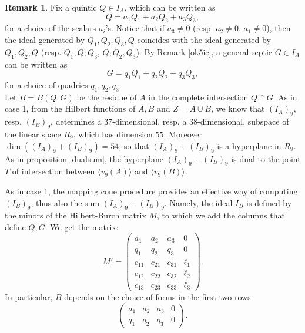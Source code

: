 \documentclass{amsart}
\theoremstyle{definition}
\newtheorem{rem0}[thm0]{Remark}
\begin{document}
\begin{rem0}\label{descr17} Fix a quintic $Q\in I_A$, which can be written as 
$$Q=a_1Q_1+a_2Q_2+a_3Q_3,$$
 for a choice of the scalars $a_i$'s. Notice that
if $a_3\neq 0$ (resp. $a_2\neq 0$. $a_1\neq 0$), then the ideal generated by $Q_1,Q_2,Q_3,Q$ coincides with the ideal generated by $Q_1,Q_2,Q$
(resp. $Q_1,Q,Q_3$, $Q,Q_2,Q_3$). By Remark \ref{ok5ic}, a general septic $G\in I_A$ can be written as 
$$G=q_1Q_1+q_2Q_2+q_3Q_3,$$
for a choice of quadrics $q_1,q_2,q_3$. \\
Let $B=B(Q,G)$ be the residue of $A$ in the complete intersection $Q\cap G$. As in case 1, from the Hilbert functions of $A,B$ and $ Z=A\cup B$, we know that
$(I_A)_9$, resp. $(I_B)_9$, determines a $37$-dimensional, resp. a $38$-dimensional, subspace of the linear space
$R_9$, which has dimension $55$. Moreover $\dim( (I_A)_9+ (I_B)_9 ) = 54$, so that
$ (I_A)_9+ (I_B)_9$ is a hyperplane in $R_9$.\\
As in proposition \ref{dualsum}, the hyperplane $ (I_A)_9+ (I_B)_9$ is dual to the point $T$ of intersection between $\langle v_9(A) \rangle$
and $\langle v_9(B) \rangle$.
\end{rem0}

As in case 1, the mapping cone procedure provides an effective way of computing $(I_B)_9$, thus also the sum $ (I_A)_9+ (I_B)_9$.
Namely, the ideal $I_B$ is defined by the minors of the Hilbert-Burch matrix $M$, to which we add the columns that define $Q,G$. We get the matrix:
\begin{equation}\label{M'}
M' = \begin{pmatrix} a_{1} & a_{2} & a_{3} & 0 \\ q_{1} & q_{2} & q_{3} & 0 \\ c_{11} & c_{21} & c_{31} & \ell_{1} \\ c_{12} & c_{22} & c_{32} & \ell_{2} \\ c_{13} & c_{23} & c_{33} & \ell_{3} 
\end{pmatrix}.
\end{equation}
  In particular, $B$ depends on the choice of forms in the first two rows
 $$ \begin{pmatrix}   a_{1} & a_{2} & a_{3} & 0 \\ q_{1} & q_{2} & q_{3} & 0 \end{pmatrix}.$$
\end{document}
